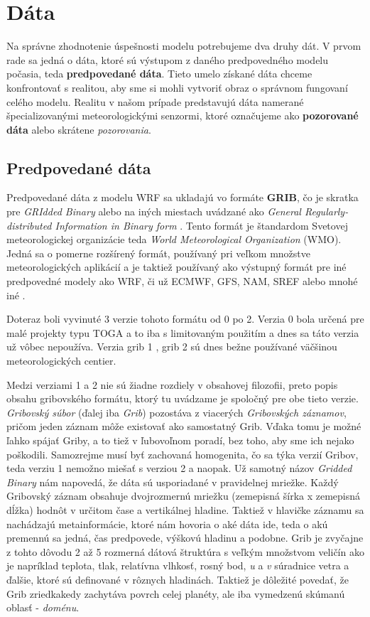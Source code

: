 \section{Dáta}
Na správne zhodnotenie úspešnosti modelu potrebujeme dva druhy dát. V prvom rade sa jedná o dáta, ktoré sú výstupom z daného predpovedného modelu počasia, teda \textbf{predpovedané dáta}. Tieto umelo získané dáta chceme konfrontovať s realitou, aby sme si mohli vytvoriť obraz o správnom fungovaní celého modelu. Realitu v našom prípade predstavujú dáta namerané špecializovanými meteorologickými senzormi, ktoré označujeme ako \textbf{pozorované dáta} alebo skrátene \textit{pozorovania}.  

\subsection{Predpovedané dáta}
Predpovedané dáta z modelu WRF sa ukladajú vo formáte \textbf{GRIB}, čo je skratka pre \textit{GRIdded Binary} \cite{GRIB} alebo na iných miestach uvádzané ako \textit{General Regularly-distributed Information in Binary form} \cite{GRIB12}. Tento formát je štandardom Svetovej meteorologickej organizácie teda \textit{World Meteorological Organization} (WMO). Jedná sa o pomerne rozšírený formát, používaný pri veľkom množstve meteorologických aplikácií a je taktiež používaný ako výstupný formát pre iné predpovedné modely ako WRF, či už ECMWF, GFS, NAM, SREF alebo mnohé iné \cite{Products}.

Doteraz boli vyvinuté 3 verzie tohoto formátu od 0 po 2. Verzia 0 bola určená pre malé projekty typu TOGA a to iba s limitovaným použitím a dnes sa táto verzia už vôbec nepoužíva. Verzia grib 1 \cite{GRIB}, grib 2 \cite{GRIB12} sú dnes bežne používané väčšinou meteorologických centier.

Medzi verziami 1 a 2 nie sú žiadne rozdiely v obsahovej filozofii, preto popis obsahu gribovského formátu, ktorý tu uvádzame je spoločný pre obe tieto verzie. 
\textit{Gribovský súbor} (ďalej iba \textit{Grib}) pozostáva z viacerých \textit{Gribovských záznamov}, pričom jeden záznam môže existovať ako samostatný Grib. Vďaka tomu je možné ľahko spájať Griby, a to tiež v ľubovoľnom poradí, bez toho, aby sme ich nejako poškodili. Samozrejme musí byť zachovaná homogenita, čo sa týka verzií Gribov, teda verziu 1 nemožno miešať s verziou 2 a naopak.
Už samotný názov \textit{Gridded Binary} nám napovedá, že dáta sú usporiadané v pravidelnej mriežke. Každý Gribovský záznam obsahuje dvojrozmernú mriežku (zemepisná šírka x zemepisná dĺžka) hodnôt v určitom čase a vertikálnej hladine. Taktiež v hlavičke záznamu sa nachádzajú metainformácie, ktoré nám hovoria o aké dáta ide, teda o akú premennú sa jedná, čas predpovede, výškovú hladinu a podobne. Grib je zvyčajne z tohto dôvodu 2 až 5 rozmerná dátová štruktúra s veľkým množstvom veličín ako je napríklad teplota, tlak, relatívna vlhkosť, rosný bod, \textit{u} a \textit{v} súradnice vetra a ďalšie, ktoré sú definované v rôznych hladinách. Taktiež je dôležité povedať, že Grib zriedkakedy zachytáva povrch celej planéty, ale iba vymedzenú skúmanú oblasť - \textit{doménu}.

